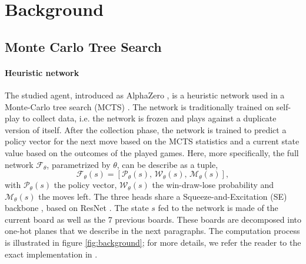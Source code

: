 \section{Background}

\subsection{Monte Carlo Tree Search}

\paragraph{Heuristic network}The studied agent, introduced as AlphaZero \cite{silver2018general}, is a heuristic network used in a Monte-Carlo tree search (MCTS) \cite{Coulom2006EfficientSA, kocsis2006bandit}. The network is traditionally trained on self-play to collect data, i.e. the network is frozen and plays against a duplicate version of itself. After the collection phase, the network is trained to predict a policy vector for the next move based on the MCTS statistics and a current state value based on the outcomes of the played games. Here, more specifically, the full network $\mathcal{F}_\theta$, parametrized by $\theta$, can be describe as a tuple,
\begin{equation}
    \mathcal{F}_\theta(s) = \left[\mathcal{P}_\theta(s),\,\mathcal{W}_\theta(s),\, \mathcal{M}_\theta(s)\right],
\end{equation}
with $\mathcal{P}_\theta(s)$ the policy vector, $\mathcal{W}_\theta(s)$ the win-draw-lose probability and $\mathcal{M}_\theta(s)$ the moves left.
The three heads share a Squeeze-and-Excitation (SE) backbone \cite{hu2019squeezeandexcitation}, based on ResNet \cite{he2016deep}.
The state $s$ fed to the network is made of the current board as well as the 7 previous boards.
These boards are decomposed into one-hot planes that we describe in the next paragraphs.
The computation process is illustrated in figure \ref{fig:background}; for more details, we refer the reader to the exact implementation in \cite{pascutto2019leela}.

